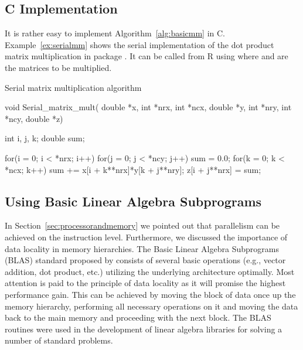 

\subsection{C Implementation}

It is rather easy to implement Algorithm~\ref{alg:basicmm} in C. 
Example~\ref{ex:serialmm} shows the serial implementation of the dot
product matrix multiplication in package . It can be called
from R using  where  and
 are the matrices to be multiplied.

\begin{Example} Serial matrix multiplication algorithm
\label{ex:serialmm}
\begin{Scode}

void Serial_matrix_mult( double *x, int *nrx, int *ncx,
			 double *y, int *nry, int *ncy,
			 double *z) {
  int i, j, k;
  double sum;

  for(i = 0; i < *nrx; i++)
    for(j = 0; j < *ncy; j++){
      sum = 0.0;
      for(k = 0; k < *ncx; k++)
	sum += x[i + k**nrx]*y[k + j**nry];
      z[i + j**nrx] = sum;
    }
}
\end{Scode}
\end{Example}

\subsection{Using Basic Linear Algebra Subprograms}
\label{sec:blas}
In Section~\ref{sec:processorandmemory} we pointed out that
parallelism can be achieved on the instruction level. Furthermore, we
discussed  the importance of data locality in memory hierarchies. The
Basic Linear Algebra Subprograms (BLAS) standard proposed by
\cite{lawson79bla} consists of several basic operations (e.g., vector
addition, dot product, etc.) utilizing the underlying architecture
optimally. Most attention is paid to the principle of data locality as
it will promise the highest performance gain. This can be achieved by
moving the block of data once up the memory hierarchy, performing all
necessary operations on it and moving the data back to the main memory
and proceeding with the next block. The BLAS routines were used in the
development of linear algebra libraries for solving a number of
standard problems.

